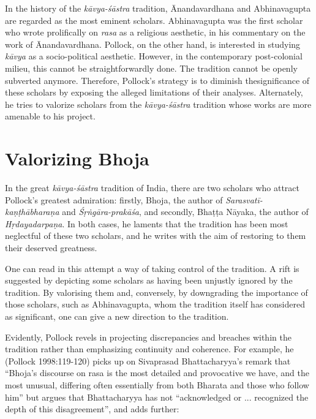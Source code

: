 In the history of the \textsl{kāvya-śāstra} tradition, Ānandavardhana and Abhinavagupta are regarded as the most eminent scholars. Abhinavagupta was the first scholar who wrote prolifically on \textsl{rasa} as a religious aesthetic, in his commentary on the work of Ānandavardhana. Pollock, on the other hand, is interested in studying \textsl{kāvya} as a socio-political aesthetic. However, in the contemporary post-colonial milieu, this cannot be straightforwardly done. The tradition cannot be openly subverted anymore. Therefore, Pollock's strategy is to diminish the\break significance of these scholars by exposing the alleged limitations of their analyses. Alternately, he tries to valorize scholars from the \textsl{kāvya-śāstra} tradition whose works are more amenable to his project.

\section*{Valorizing Bhoja}

In the great \textsl{kāvya-śāstra} tradition of India, there are two scholars who attract Pollock's greatest admiration: firstly, Bhoja, the author of \textsl{Sarasvatī-kaṇṭhābharaṇa} and \textsl{Śṛṅgāra-prakāśa}, and secondly, Bhaṭṭa Nāyaka, the author of \textsl{Hṛdayadarpaṇa}. In both cases, he laments that the tradition has been most neglectful of these two scholars, and he writes with the aim of restoring to them their deserved greatness. 

One can read in this attempt a way of taking control of the tradition. A rift is suggested by depicting some scholars as having been unjustly ignored by the tradition. By valorising them and, conversely, by downgrading the importance of those scholars, such as Abhinavagupta, whom the tradition itself has considered as significant, one can give a new direction to the tradition.

Evidently, Pollock revels in projecting discrepancies and breaches with\-in the tradition rather than emphasizing continuity and coherence. For example, he (Pollock 1998:119-120) picks up on Sivaprasad Bhattacharyya's remark that ``Bhoja's discourse on rasa is the most detailed and provocative we have, and the most unusual, differing often essentially from both Bharata and those who follow him'' but argues that Bhattacharyya has not ``acknowledged or ... recognized the depth of this disagreement'', and adds further:

